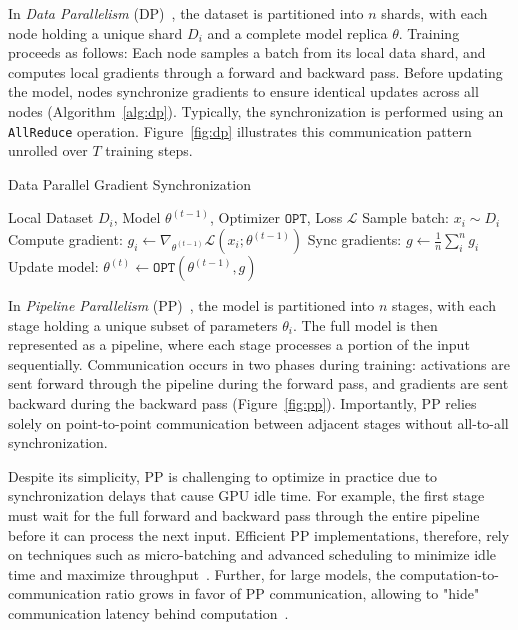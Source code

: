 \documentclass{article}
\begin{document}
In \textit{Data Parallelism} (DP)~\cite{dean2012dp}, the dataset is partitioned into $n$ shards, with each node holding a unique shard $D_i$ and a complete model replica $\theta$. Training proceeds as follows: Each node samples a batch from its local data shard, and computes local gradients through a forward and backward pass. Before updating the model, nodes synchronize gradients to ensure identical updates across all nodes (Algorithm~\ref{alg:dp}). Typically, the synchronization is performed using an \texttt{AllReduce} operation. Figure~\ref{fig:dp} illustrates this communication pattern unrolled over $T$ training steps.

\begin{algorithm}
\caption{Data Parallel Gradient Synchronization}
\label{alg:dp}
\begin{algorithmic}[1]
 Local Dataset $D_i$, Model $\theta^{(t-1)}$, Optimizer $\mathtt{OPT}$, Loss $\mathcal{L}$
\State Sample batch: $x_i\sim D_i$
\State Compute gradient: $g_i \gets \nabla_{\theta^{(t-1)}} \mathcal{L}(x_i; \theta^{(t-1)})$
\State Sync gradients: $g \gets \frac{1}{n}\sum_{i}^n g_i$ 
\State Update model: $\theta^{(t)} \gets \mathtt{OPT}(\theta^{(t-1)}, g)$
\end{algorithmic}
\end{algorithm}

In \textit{Pipeline Parallelism} (PP)~\cite{huang2019gpipe}, the model is partitioned into $n$ stages, with each stage holding a unique subset of parameters $\theta_i$. The full model is then represented as a pipeline, where each stage processes a portion of the input sequentially. Communication occurs in two phases during training: activations are sent forward through the pipeline during the forward pass, and gradients are sent backward during the backward pass (Figure~\ref{fig:pp}). Importantly, PP relies solely on point-to-point communication between adjacent stages without all-to-all synchronization.

Despite its simplicity, PP is challenging to optimize in practice due to synchronization delays that cause GPU idle time. For example, the first stage must wait for the full forward and backward pass through the entire pipeline before it can process the next input. Efficient PP implementations, therefore, rely on techniques such as micro-batching and advanced scheduling to minimize idle time and maximize throughput~\cite{harlap2018pipedream, huang2019gpipe}. Further, for large models, the computation-to-communication ratio grows in favor of PP communication, allowing to "hide" communication latency behind computation~\cite{fernandez2024scalingtrends}.
\end{document}
